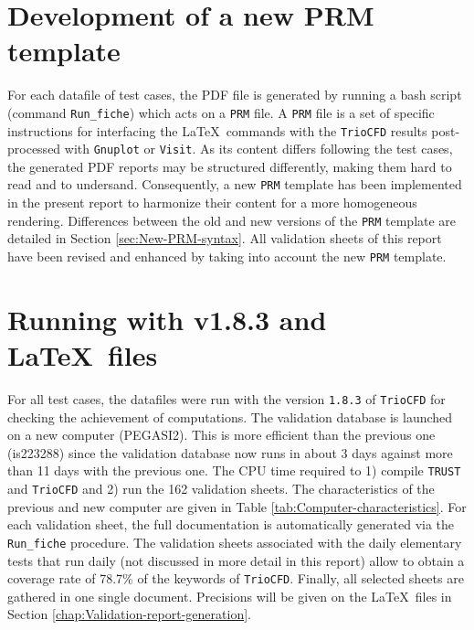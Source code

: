 \section{Development of a new \textsf{PRM} template}

For each datafile of test cases, the PDF file is generated by running
a bash script (command \texttt{Run\_fiche}) which acts on a \texttt{PRM}
file. A \texttt{PRM} file is a set of specific instructions for interfacing
the \LaTeX ~commands with the \texttt{TrioCFD} results post-processed
with \texttt{Gnuplot} or \texttt{Visit}. As its content differs following
the test cases, the generated PDF reports may be structured differently,
making them hard to read and to undersand. Consequently, a new \texttt{PRM} template
has been implemented in the present report to harmonize their content
for a more homogeneous rendering. Differences
between the old and new versions of the \texttt{PRM} template are detailed
in Section \ref{sec:New-PRM-syntax}. All validation sheets of this
report have been revised and enhanced by taking into account the new
\texttt{PRM} template.

\section{Running with \textsf{v1.8.3} and \LaTeX~files}
For all test cases, the datafiles were run with the version \texttt{1.8.3}
of \texttt{TrioCFD} for checking the achievement of computations. The validation
database is launched on a new computer (PEGASI2). This is more efficient than
the previous one (is223288) since the validation database now runs in about 
3 days against more than 11 days with the previous one. 
The CPU time required to 1) compile \texttt{TRUST} and \texttt{TrioCFD}
and 2) run the 162 validation sheets.
The characteristics of the previous and new computer are given in Table \ref{tab:Computer-characteristics}.
For each validation sheet, the full documentation is automatically
generated via the \texttt{Run\_fiche} procedure. The validation
sheets associated with the daily elementary tests that run daily (not discussed
in more detail in this report) allow to obtain a coverage rate of
78.7\% of the keywords of \texttt{TrioCFD}. Finally, all selected sheets are
gathered in one single document. Precisions will be given on the \LaTeX~files
in Section \ref{chap:Validation-report-generation}.

